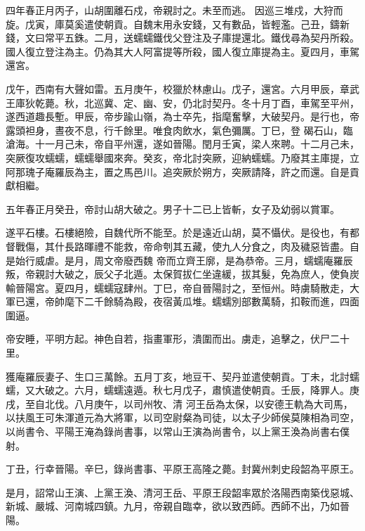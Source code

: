 \begin{pinyinscope}
 四年春正月丙子，山胡圍離石戍，帝親討之。未至而逃。
 因巡三堆戍，大狩而旋。戊寅，庫莫奚遣使朝貢。自魏末用永安錢，又有數品，皆輕濫。己丑，鑄新錢，文曰常平五銖。二月，送蠕蠕鐵伐父登注及子庫提還北。鐵伐尋為契丹所殺。國人復立登注為主。仍為其大人阿富提等所殺，國人復立庫提為主。夏四月，車駕還宮。



 戊午，西南有大聲如雷。五月庚午，校獵於林慮山。戊子，還宮。六月甲辰，章武王庫狄乾薨。秋，北巡冀、定、幽、安，仍北討契丹。冬十月丁酉，車駕至平州，遂西道趣長塹。甲辰，帝步踰山嶺，為士卒先，指麾奮擊，大破契丹。是行也，帝露頭袒身，晝夜不息，行千餘里。唯食肉飲水，氣色彌厲。丁巳，登
 碣石山，臨滄海。十一月己未，帝自平州還，遂如晉陽。閏月壬寅，梁人來聘。十二月己未，突厥復攻蠕蠕，蠕蠕舉國來奔。癸亥，帝北討突厥，迎納蠕蠕。乃廢其主庫提，立阿那瑰子庵羅辰為主，置之馬邑川。追突厥於朔方，突厥請降，許之而還。自是貢獻相繼。



 五年春正月癸丑，帝討山胡大破之。男子十二已上皆斬，女子及幼弱以賞軍。



 遂平石樓。石樓絕險，自魏代所不能至。於是遠近山胡，莫不懾伏。是役也，有都督戰傷，其什長路暉禮不能救，帝命刳其五藏，使九人分食之，肉及穢惡皆盡。自是始行威虐。是月，周文帝廢西魏
 帝而立齊王廓，是為恭帝。三月，蠕蠕庵羅辰叛，帝親討大破之，辰父子北遁。太保賀拔仁坐違緩，拔其髮，免為庶人，使負炭輸晉陽宮。夏四月，蠕蠕寇肆州。丁巳，帝自晉陽討之，至恒州。時虜騎散走，大軍已還，帝帥麾下二千餘騎為殿，夜宿黃瓜堆。蠕蠕別部數萬騎，扣鞍而進，四面圍逼。



 帝安睡，平明方起。神色自若，指畫軍形，潰圍而出。虜走，追擊之，伏尸二十里。



 獲庵羅辰妻子、生口三萬餘。五月丁亥，地豆干、契丹並遣使朝貢。丁未，北討蠕蠕，又大破之。六月，蠕蠕遠遁。秋七月戊子，肅慎遣使朝貢。壬辰，降罪人。庚戌，至自北伐。八月庚午，以司州牧、清
 河王岳為太保，以安德王軌為大司馬，以扶風王可朱渾道元為大將軍，以司空尉粲為司徒，以太子少師侯莫陳相為司空，以尚書令、平陽王淹為錄尚書事，以常山王演為尚書令，以上黨王渙為尚書右僕射。



 丁丑，行幸晉陽。辛巳，錄尚書事、平原王高隆之薨。封冀州刺史段韶為平原王。



 是月，詔常山王演、上黨王渙、清河王岳、平原王段韶率眾於洛陽西南築伐惡城、新城、嚴城、河南城四鎮。九月，帝親自臨幸，欲以致西師。西師不出，乃如晉陽。




\end{pinyinscope}
